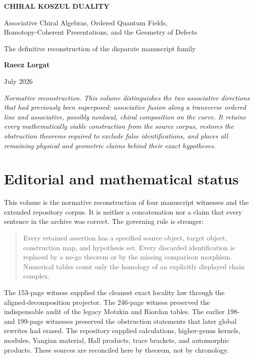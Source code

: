 \hypersetup{pageanchor=false}
\begin{titlepage}
\centering
\vspace*{1.05in}
{\Huge\bfseries\color{ink} CHIRAL KOSZUL DUALITY\par}
\vspace{0.35in}
{\Large\color{deep} Associative Chiral Algebras, Ordered Quantum Fields,\\
Homotopy-Coherent Presentations, and the Geometry of Defects\par}
\vspace{0.28in}
{\large The definitive reconstruction of the disparate manuscript family\par}
\vfill
{\Large\bfseries Raeez Lorgat\par}
\vspace{0.18in}
{\large July 2026\par}
\vfill
\begin{minipage}{0.82\textwidth}
\small\itshape
Normative reconstruction.  This volume distinguishes the two associative directions that had previously been superposed: associative fusion along a transverse ordered line and associative, possibly nonlocal, chiral composition on the curve.  It retains every mathematically viable construction from the source corpus, restores the obstruction theorems required to exclude false identifications, and places all remaining physical and geometric claims behind their exact hypotheses.
\end{minipage}
\end{titlepage}
\hypersetup{pageanchor=true}

\chapter*{Editorial and mathematical status}

This volume is the normative reconstruction of four manuscript witnesses and the extended repository corpus.  It is neither a concatenation nor a claim that every sentence in the archive was correct.  The governing rule is stronger:
\begin{quote}
Every retained assertion has a specified source object, target object, construction map, and hypothesis set.  Every discarded identification is replaced by a no-go theorem or by the missing comparison morphism.  Numerical tables count only the homology of an explicitly displayed chain complex.
\end{quote}
The 153-page witness supplied the cleanest exact locality law through the aligned-decomposition projector.  The 246-page witness preserved the indispensable audit of the legacy Motzkin and Riordan tables.  The earlier 198- and 199-page witnesses preserved the obstruction statements that later global rewrites had erased.  The repository supplied calculations, higher-genus kernels, modules, Yangian material, Hall products, trace brackets, and automorphic products.  These sources are reconciled here by theorem, not by chronology.

